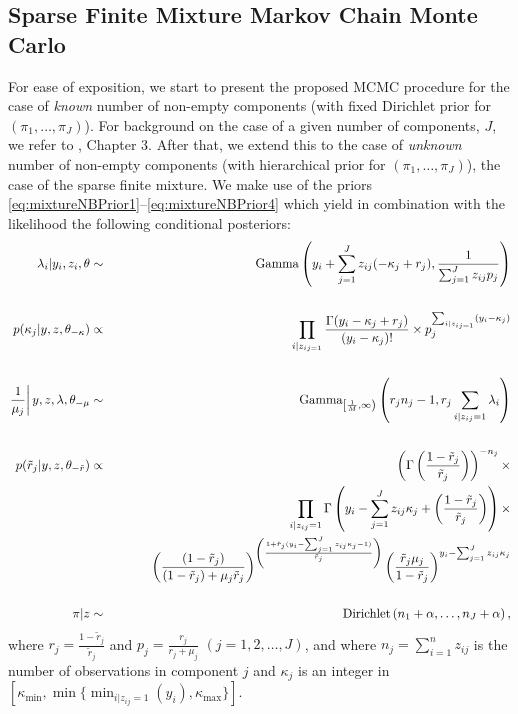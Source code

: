 \documentclass[11pt]{article}
\begin{document}
\subsection{Sparse Finite Mixture Markov Chain Monte Carlo}
For ease of exposition, we start to present the proposed MCMC procedure for the case of  \textit{known} number of non-empty components (with fixed Dirichlet prior for $(\pi_1,\ldots,\pi_J)$). For background on the case of a given number of components, $J$, we refer to \cite{fruhwirth2006finite}, Chapter 3. After that, we extend this to the case of \textit{unknown} number of non-empty components (with hierarchical prior for $(\pi_1,\ldots,\pi_J)$), the case of the sparse finite mixture. We make use of the  priors \eqref{eq:mixtureNBPrior1}--\eqref{eq:mixtureNBPrior4} which yield in combination with the likelihood the following conditional posteriors:
%
%
\begin{eqnarray}
\lambda_i | y_i, z_i,\theta  & 
\sim & \mbox{Gamma} \left( y_i + \sum_{j=1}^{J} z_{ij}(-\kappa_j + r_j), \frac{1}{\sum_{j=1}^{J} z_{ij} p_j} \right)  \\
\nonumber \\
p(\kappa_j|y,z,\theta_{-\kappa})
      & \propto &
\prod_{i|z_{ij=1}} 
\frac{\Gamma(y_i-\kappa_j+r_j)}{(y_i-\kappa_j)!} \times p_j^{\sum_{i|z_{ij=1}} (y_i-\kappa_j)}
\\
\nonumber \\
\left. \frac{1}{\mu_j} \right| y,z,\lambda,\theta_{-\mu}
& \sim &
\mbox{Gamma}_{\left[\frac{1}{M}, \infty \right)} \left(r_j n_j-1, r_j \sum_{i|z_{ij}=1} \lambda_i \right) \\
\nonumber \\
p(\tilde r_j| y, z, \theta_{-\tilde r}) &
\propto &
\left( \Gamma \left( \frac{1-\tilde r_j}{\tilde r_j} \right)\right)^{-n_j} \times \\
&  &
\prod_{i|z_{ij}=1} \Gamma \left(y_i - \sum_{j=1}^{J} z_{ij} \kappa_j + \left( \frac{1-\tilde r_j}{\tilde r_j} \right) \right) 
\times \nonumber \\
& & \hspace{1.0cm} \left( \frac{(1-\tilde r_j)}{(1-\tilde r_j) + \mu_j \tilde r_j} \right)^{\left( \frac{1 + \tilde r_j (y_i - \sum_{j=1}^{J} z_{ij} \kappa_j -1)}{\tilde r_j} \right) } 
\left(\frac{\tilde r_j \mu_j}{1-\tilde r_j}\right)^{y_i - \sum_{j=1}^{J} z_{ij} \kappa_j} \nonumber \\
\nonumber \\
\pi|z & \sim & \mbox{Dirichlet}\left(n_1 + \alpha, \ldots, n_J + \alpha \right),
\end{eqnarray}
where $r_j = \frac{1 - \tilde r_j}{\tilde r_j}$ and $p_j = \frac{r_j}{r_j+\mu_j}$ $(j=1,2,\ldots,J)$,
and where $n_j=\sum_{i=1}^n z_{ij}$ is the number of observations in component $j$ and $\kappa_j$ is an integer in
$[\kappa_{\mbox{min}}, \min\{  \min_{i|z_{ij}=1}\left(y_i\right), \kappa_{\max} \}]$.
\end{document}
